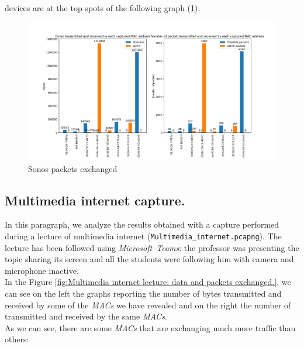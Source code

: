 devices are at the top spots of the following graph (\ref{fig:Sonos_packets}).
\begin{figure}[h]
    \includegraphics[width=\textwidth]{Graphs/SONOS_bytes_packets.png}
    \caption{Sonos packets exchanged}
    \label{fig:Sonos_packets}
\end{figure}


\subsection{Multimedia internet capture.}
In this paragraph, we analyze the results obtained with a capture performed during a lecture of
multimedia internet (\texttt{Multimedia\_internet.pcapng}).
The lecture has been followed using \textit{Microsoft\ Teams}: the professor was presenting the
topic sharing its screen and all the students were following him with camera and microphone inactive.\\
In the Figure \ref{fig:Multimedia internet lecture: data and packets exchanged.}, we can see on the
left the graphs reporting the number of bytes transmitted and received by some of the \textit{MACs}
we have revealed and on the right the number of transmitted and received by the same \textit{MACs}.\\
As we can see, there are some \textit{MACs} that are exchanging much more traffic than others:

